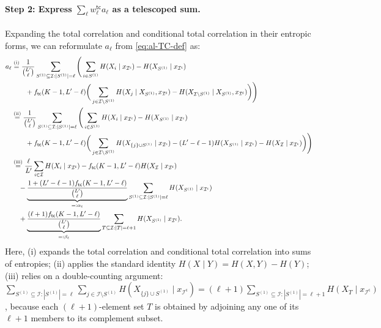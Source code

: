 \documentclass[english]{article}
\newcommand{\cI}{\mathcal{I}}
\newcommand{\numpf}[2]{\overset{(\mathrm{#1})}{#2}}
\newcommand{\tc}{\mathsf{tc}}
\begin{document}
\paragraph{Step 2: Express $\sum_{\ell} w^\tc_{\ell} a_{\ell}$ as a telescoped sum.}
Expanding the total correlation and conditional total correlation in their entropic forms, we can reformulate $a_\ell$ from \eqref{eq:al-TC-def} as:
\begin{align}
    a_\ell &\numpf{i}{=} \frac{1}{\binom{L'}{\ell}}\sum_{S^{(1)} \subseteq \cI: |S^{(1)}|=\ell} \Bigg( \sum_{i \in S^{(1)}} H(X_i \mid x_{\cI^\mathsf{c}}) - H(X_{S^{(1)}} \mid x_{\cI^\mathsf{c}}) \notag \\
    &\quad \quad + f_\tc(K-1, L' - \ell) \bigg( \sum_{j \in \cI \setminus S^{(1)}} H(X_j \mid X_{S^{(1)}}, x_{\cI^\mathsf{c}}) - H(X_{\cI \setminus S^{(1)}} \mid X_{S^{(1)}}, x_{\cI^\mathsf{c}}) \bigg) \Bigg)\notag \\
    &\numpf{ii}{=} \frac{1}{\binom{L'}{\ell}}\sum_{S^{(1)} \subseteq \cI: |S^{(1)}|=\ell} \Bigg( \sum_{i \in S^{(1)}} H(X_i \mid x_{\cI^\mathsf{c}}) - H(X_{S^{(1)}} \mid x_{\cI^\mathsf{c}}) \notag \\
    &\quad \quad + f_\tc(K-1, L' - \ell) \bigg( \sum_{j \in \cI \setminus S^{(1)}} H(X_{\{j\} \cup S^{(1)}} \mid x_{\cI^\mathsf{c}}) - (L' - \ell - 1) H(X_{S^{(1)}} \mid x_{\cI^\mathsf{c}}) - H(X_{\cI} \mid x_{\cI^\mathsf{c}}) \bigg) \Bigg)\notag \\
    &\numpf{iii}{=} \frac{\ell}{L'} \sum_{i \in \cI} H(X_i \mid x_{\cI^\mathsf{c}}) - f_\tc(K-1, L'-\ell) H(X_{\cI} \mid x_{\cI^\mathsf{c}}) \notag \\
    &\quad - \underbrace{\frac{1 + (L' - \ell - 1) f_\tc(K - 1, L' - \ell)}{\binom{L'}{\ell}}}_{=:\alpha_\ell}\sum_{S^{(1)} \subseteq \cI: |S^{(1)}|=\ell} H(X_{S^{(1)}} \mid x_{\cI^\mathsf{c}}) \notag\\
    & \quad + \underbrace{\frac{(\ell + 1) f_\tc(K-1, L'-\ell)}{\binom{L'}{\ell}}}_{=:\beta_\ell} \sum_{T \subseteq \cI: |T|=\ell+1} H(X_{S^{(1)} } \mid x_{\cI^\mathsf{c}}). \label{eq:al-TC}
\end{align}
Here, (i) expands the total correlation and conditional total correlation into sums of entropies; (ii) applies the standard identity $H(X\mid Y) = H(X,Y) - H(Y)$; (iii) relies on a double-counting argument: $\sum_{S^{(1)} \subseteq \cI: |S^{(1)}|=\ell}\sum_{j \in \cI \setminus S^{(1)}} H(X_{\{j\} \cup S^{(1)}} \mid x_{\cI^\mathsf{c}}) = (\ell + 1) \sum_{S^{(1)}  \subseteq \cI: |S^{(1)} |=\ell+1} H(X_T \mid x_{\cI^\mathsf{c}})$, because each $(\ell+1)$-element set $T$ is obtained by adjoining any one of its $\ell+1$ members to its complement subset.
\end{document}
